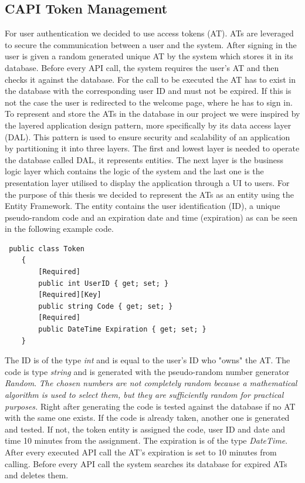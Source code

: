 \subsection{CAPI Token Management}
For user authentication we decided to use access tokens (AT). ATs are leveraged to secure the communication between a user and the system. After signing in the user is given a random generated unique AT by the system which stores it in its database. Before every API call, the system requires the user's AT and then checks it against the database. For the call to be executed the AT has to exist in the database with the corresponding user ID and must not be expired. If this is not the case the user is redirected to the welcome page, where he has to sign in. To represent and store the ATs in the database in our project we were inspired by the layered application design pattern, more specifically by its data access layer (DAL). This pattern is used to ensure security and scalability of an application by partitioning it into three layers. The first and lowest layer is needed to operate the database called DAL, it represents entities. The next layer is the business logic layer which contains the logic of the system and the last one is the presentation layer utilised to display the application through a UI to users. For the purpose of this thesis we decided to represent the ATs as an entity using the Entity Framework. The entity contains the user identification (ID), a unique pseudo-random code and an expiration date and time (expiration) as can be seen in the following example code. 
\lstset{style=sharpc, numbers=left}
\begin{lstlisting}
 public class Token
    {
        [Required]
        public int UserID { get; set; }
        [Required][Key]
        public string Code { get; set; }
        [Required]
        public DateTime Expiration { get; set; }
    }
\end{lstlisting}
The ID is of the type \textit{int} and is equal to the user's ID who "owns" the AT. The code is type \textit{string} and is generated with the pseudo-random number generator \textit{Random}. \textit{The chosen numbers are not completely random because a mathematical algorithm is used to select them, but they are sufficiently random for practical purposes.}\cite{msdn_documentation_system_random} Right after generating the code is tested against the database if no AT with the same one exists. If the code is already taken, another one is generated and tested. If not, the token entity is assigned the code, user ID and date and time 10 minutes from the assignment. The expiration is of the type \textit{DateTime}. After every executed API call the AT's expiration is set to 10 minutes from calling. 
Before every API call the system searches its database for expired ATs and deletes them. 

